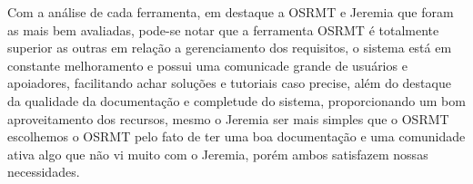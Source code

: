   Com a análise de cada ferramenta, em destaque a OSRMT e Jeremia que foram as mais bem avaliadas, pode-se notar que a ferramenta
  OSRMT é totalmente superior as outras em relação a gerenciamento dos requisitos, o sistema está em constante melhoramento e possui
  uma comunicade grande de usuários e apoiadores, facilitando achar soluções e tutoriais caso precise, além do destaque da qualidade
  da documentação e completude do sistema, proporcionando um bom aproveitamento dos recursos, mesmo o Jeremia ser mais simples que o
  OSRMT escolhemos o OSRMT pelo fato de ter uma boa documentação e uma comunidade ativa algo que não vi muito com o Jeremia, porém
  ambos satisfazem nossas necessidades.

